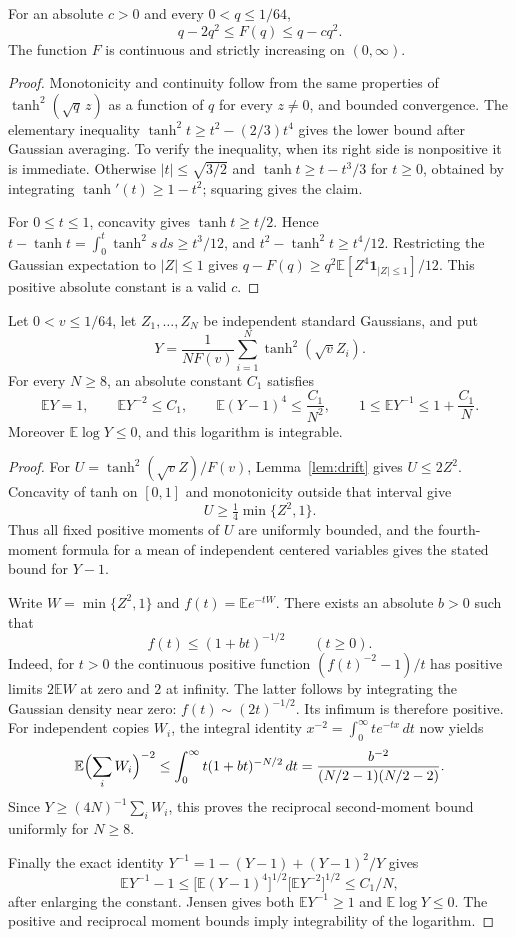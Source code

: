 \documentclass[11pt]{article}
\newcommand{\E}{\mathbb E}\newcommand{\R}{\mathbb R}\newcommand{\KL}{\operatorname{KL}}
\begin{document}
\begin{lemma}
\label{lem:drift}
For an absolute $c>0$ and every $0<q\le1/64$,
\[
 q-2q^2\le F(q)\le q-cq^2.
\]
The function $F$ is continuous and strictly increasing on $(0,\infty)$.
\end{lemma}
\begin{proof}
Monotonicity and continuity follow from the same properties of $\tanh^2(\sqrt q\,z)$ as a function of $q$ for every $z\ne0$, and bounded convergence. The elementary inequality
$\tanh^2 t\ge t^2-(2/3)t^4$ gives the lower bound after Gaussian averaging. To verify the inequality, when its right side is nonpositive it is immediate. Otherwise $|t|\le\sqrt{3/2}$ and $\tanh t\ge t-t^3/3$ for $t\ge0$, obtained by integrating $\tanh'(t)\ge1-t^2$; squaring gives the claim.

For $0\le t\le1$, concavity gives $\tanh t\ge t/2$. Hence
$t-\tanh t=\int_0^t\tanh^2 s\,ds\ge t^3/12$, and
$t^2-\tanh^2t\ge t^4/12$.
Restricting the Gaussian expectation to $|Z|\le1$ gives
$q-F(q)\ge q^2\E[Z^4\mathbf1_{|Z|\le1}]/12$.
This positive absolute constant is a valid $c$.
\end{proof}

\begin{lemma}
\label{lem:inverse}
Let $0<v\le1/64$, let $Z_1,\ldots,Z_N$ be independent standard Gaussians, and put
\[
 Y=\frac1{NF(v)}\sum_{i=1}^N\tanh^2(\sqrt v Z_i).
\]
For every $N\ge8$, an absolute constant $C_1$ satisfies
\[
 \E Y=1,\qquad \E Y^{-2}\le C_1,\qquad
 \E(Y-1)^4\le\frac{C_1}{N^2},\qquad
 1\le\E Y^{-1}\le1+\frac{C_1}{N}.
\]
Moreover $\E\log Y\le0$, and this logarithm is integrable.
\end{lemma}
\begin{proof}
For $U=\tanh^2(\sqrt v Z)/F(v)$, Lemma~\ref{lem:drift} gives $U\le2Z^2$. Concavity of tanh on $[0,1]$ and monotonicity outside that interval give
\[
 U\ge\tfrac14\min\{Z^2,1\}.
\]
Thus all fixed positive moments of $U$ are uniformly bounded, and the fourth-moment formula for a mean of independent centered variables gives the stated bound for $Y-1$.

Write $W=\min\{Z^2,1\}$ and $f(t)=\E e^{-tW}$. There exists an absolute $b>0$ such that
\[
 f(t)\le(1+bt)^{-1/2}\qquad(t\ge0).
\]
Indeed, for $t>0$ the continuous positive function $(f(t)^{-2}-1)/t$ has positive limits $2\E W$ at zero and $2$ at infinity. The latter follows by integrating the Gaussian density near zero: $f(t)\sim(2t)^{-1/2}$. Its infimum is therefore positive. For independent copies $W_i$, the integral identity $x^{-2}=\int_0^\infty t e^{-tx}\,dt$ now yields
\[
 \E\Bigl(\sum_iW_i\Bigr)^{-2}
 \le\int_0^\infty t(1+bt)^{-N/2}\,dt
 =\frac{b^{-2}}{(N/2-1)(N/2-2)}.
\]
Since $Y\ge(4N)^{-1}\sum_iW_i$, this proves the reciprocal second-moment bound uniformly for $N\ge8$.

Finally the exact identity
$Y^{-1}=1-(Y-1)+(Y-1)^2/Y$ gives
\[
 \E Y^{-1}-1
 \le\bigl[\E(Y-1)^4\bigr]^{1/2}\bigl[\E Y^{-2}\bigr]^{1/2}
 \le C_1/N,
\]
after enlarging the constant. Jensen gives both $\E Y^{-1}\ge1$ and $\E\log Y\le0$. The positive and reciprocal moment bounds imply integrability of the logarithm.
\end{proof}
\end{document}
